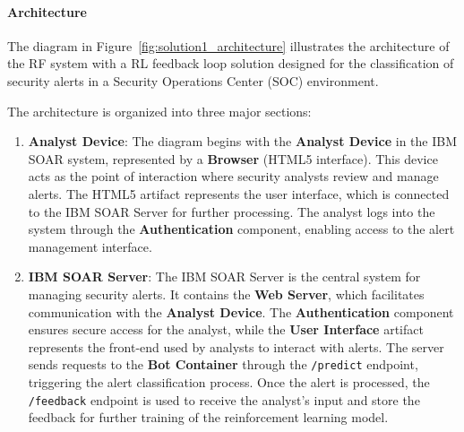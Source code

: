 \paragraph{Architecture}

The diagram in Figure~\ref{fig:solution1_architecture} illustrates the architecture of the \gls{RF} system with a \gls{RL} feedback loop solution designed for the classification of security alerts in a Security Operations Center (SOC) environment.

The architecture is organized into three major sections:

\begin{enumerate}
    \item \textbf{Analyst Device}: The diagram begins with the \textbf{Analyst Device} in the IBM SOAR system, represented by a \textbf{Browser} (HTML5 interface). This device acts as the point of interaction where security analysts review and manage alerts. The HTML5 artifact represents the user interface, which is connected to the IBM SOAR Server for further processing. The analyst logs into the system through the \textbf{Authentication} component, enabling access to the alert management interface.
    
    \item \textbf{IBM SOAR Server}: The IBM SOAR Server is the central system for managing security alerts. It contains the \textbf{Web Server}, which facilitates communication with the \textbf{Analyst Device}. The \textbf{Authentication} component ensures secure access for the analyst, while the \textbf{User Interface} artifact represents the front-end used by analysts to interact with alerts. The server sends requests to the \textbf{Bot Container} through the \texttt{/predict} endpoint, triggering the alert classification process. Once the alert is processed, the \texttt{/feedback} endpoint is used to receive the analyst’s input and store the feedback for further training of the reinforcement learning model.
    

\end{enumerate}
